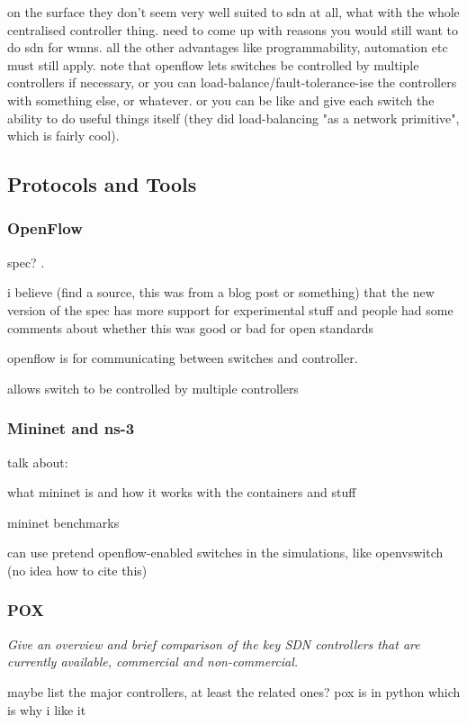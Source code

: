 \documentclass[pdftex,12pt,a4paper]{article}
\begin{document}
on the surface they don't seem very well suited to sdn at all, what with the whole centralised controller thing. need to come up with reasons you would still want to do sdn for wmns. all the other advantages like programmability, automation etc must still apply. note that openflow lets switches be controlled by multiple controllers if necessary, or you can load-balance/fault-tolerance-ise the controllers with something else, or whatever. or you can be like \cite{handigol:asterix} and give each switch the ability to do useful things itself (they did load-balancing "as a network primitive", which is fairly cool).

\subsection{Protocols and Tools}
\subsubsection{OpenFlow}
spec? \cite{onf:switch133}. 

i believe (find a source, this was from a blog post or something) that the new version of the spec has more support for experimental stuff and people had some comments about whether this was good or bad for open standards

openflow is for communicating between switches and controller. 

allows switch to be controlled by multiple controllers \cite{mckeown:campus}

\subsubsection{Mininet and ns-3}
talk about:

what mininet is and how it works with the containers and stuff \cite{handigol:mininet}

mininet benchmarks \cite{handigol:benchmarks}

can use pretend openflow-enabled switches in the simulations, like openvswitch (no idea how to cite this)

\subsubsection{POX}
\emph{Give an overview and brief comparison of the key SDN controllers that are currently available, commercial and non-commercial.}

maybe list the major controllers, at least the related ones? pox is in python which is why i like it
\end{document}

